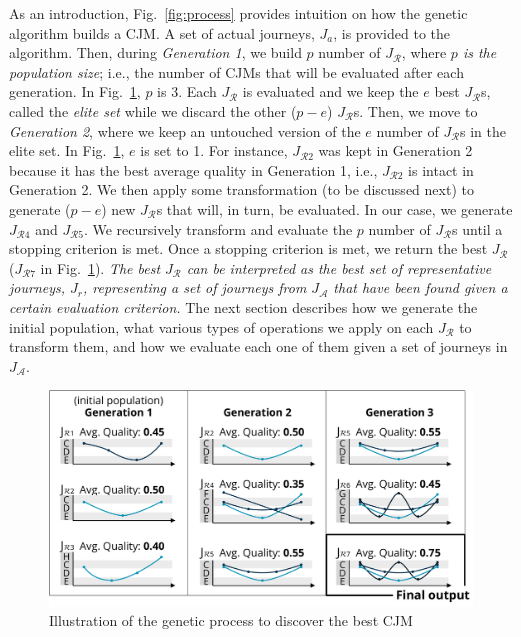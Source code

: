 \documentclass[runningheads]{llncs}
\begin{document}
As an introduction, Fig.~\ref{fig:process} provides intuition on how the genetic algorithm builds a CJM. A set of actual journeys, $J_{a}$, is provided to the algorithm. Then, during  {\it Generation 1}, we build $p$ number of $J_{\mathcal{R}}$, where {\it $p$ is the population size}; i.e., the number of CJMs that will be evaluated after each generation. In Fig.~\ref{fig:intuition2}, $p$ is 3. Each $J_{\mathcal{R}}$ is evaluated and we keep the $e$ best $J_{\mathcal{R}}$s, called the {\it elite set} while we discard the other ($p-e$) $J_{\mathcal{R}}$s. Then, we move to {\it Generation 2}, where we keep an untouched version of the $e$ number of $J_{\mathcal{R}}$s in the elite set. In Fig.~\ref{fig:intuition2}, $e$ is set to 1. For instance, $J_{\mathcal{R}2}$ was kept in Generation 2 because it has the best average quality in Generation 1, i.e., $J_{\mathcal{R}2}$ is intact in Generation 2. We then apply some transformation (to be discussed next) to generate ($p-e$) new $J_{\mathcal{R}}$s that will, in turn, be evaluated. In our case, we generate $J_{\mathcal{R}4}$ and $J_{\mathcal{R}5}$. We recursively transform and evaluate the $p$ number of $J_{\mathcal{R}}$s until a stopping criterion is met. Once a stopping criterion is met, we return the best $J_{\mathcal{R}}$ ($J_{\mathcal{R}7}$ in Fig.~\ref{fig:intuition2}). { \it The best $J_{\mathcal{R}}$ can be interpreted as the best set of representative journeys, $J_r$, representing a set of journeys from $J_{\mathcal{A}}$ that have been found given a certain evaluation criterion.} The next section describes how we generate the initial population, what various types of operations we apply on each $J_{\mathcal{R}}$ to transform them, and how we evaluate each one of them given a set of journeys in $J_{\mathcal{A}}$. 

\begin{figure}
\centering
\includegraphics[width=0.7\columnwidth]{05_schema/intuition2.pdf}
  \caption{Illustration of the genetic process to discover the best CJM}
  \label{fig:intuition2}
\end{figure}
\end{document}
